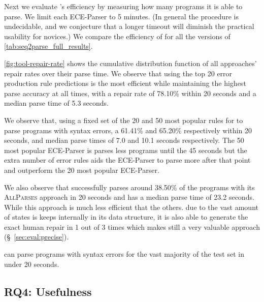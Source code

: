 
Next we evaluate \toolname's efficiency by measuring how many programs it is
able to parse. We limit each ECE-Parser to 5 minutes. (In general the procedure
is undecidable, and we conjecture that a longer timeout will diminish the
practical usability for novices.) We compare the efficiency of \toolname for all
the versions of \autoref{tab:seq2parse_full_results}.

\autoref{fig:tool-repair-rate} shows the cumulative distribution function of all
\toolname approaches' repair rates over their parse time. We observe that using
the top 20 error production rule predictions is the most efficient while
maintaining the highest parse accuracy at all times, with a repair rate of
78.10\% within 20 seconds and a median parse time of 5.3 seconds.

We observe that, using a fixed set of the 20 and 50 most popular rules for
\toolname to parse programs with syntax errors, a 61.41\% and 65.20\%
respectively within 20 seconds, and median parse times of 7.0 and 10.1 seconds
respectively. The 50 most popular ECE-Parser is parses less programs until the
45 seconds but the extra number of error rules aids the ECE-Parser to parse more
after that point and outperform the 20 most popular ECE-Parser.

We also observe that \toolname successfully parses around 38.50\% of the
programs with its \textsc{AllParses} approach in 20 seconds and has a median
parse time of 23.2 seconds. While this approach is much less efficient that the
others. due to the vast amount of states is keeps internally in its data
structure, it is also able to generate the exact human repair in 1 out of 3
times which makes still a very valuable approach (\S~\ref{sec:eval:precise}).

\begin{framed}
  \noindent \toolname can parse programs with syntax errors for the vast
  majority of the test set in under 20 seconds.
\end{framed}

\subsection{RQ4: Usefulness}
\label{sec:eval:useful}


